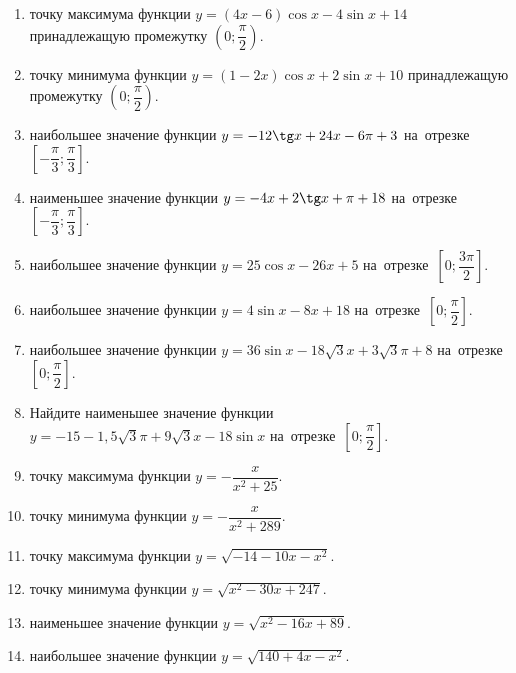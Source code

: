 \documentclass[a4paper,10pt]{article}
\begin{document}
\begin{enumerate}
\item {} точку максимума функции $y=\left(4x-6\right)\cos x -4\sin x+14$
принадлежащую промежутку $\left(0;\dfrac{\pi}{2}\right)$.

\item {} точку минимума функции $y=\left(1-2x\right)\cos x +2\sin x+10$
принадлежащую промежутку $\left(0;\dfrac{\pi}{2}\right)$.

\item {} наибольшее значение функции $y=-12\tg x +24x-6\pi +3$ на~отрезке~$\left[-\dfrac{\pi}{3};\dfrac{\pi}{3}\right]$.

\item {} наименьшее значение функции $y=-4x +2\tg x+\pi+18$ на~отрезке~$\left[-\dfrac{\pi}{3};\dfrac{\pi}{3}\right]$.

\item {} наибольшее значение функции $y=25\cos x-26x+5$ на~отрезке~$\left[0;\dfrac{3\pi}{2}\right]$.

\item {} наибольшее значение функции $y=4\sin x-8x+18$ на~отрезке~$\left[0;\dfrac{\pi}{2}\right]$.

\item {} наибольшее значение функции $y=36\sin x-18\sqrt{3}x+3\sqrt{3}\pi +8$ на~отрезке~$\left[0;\dfrac{\pi}{2}\right]$.

\item Найдите наименьшее значение функции $y=-15-1,5\sqrt{3}\pi+9\sqrt{3}x-18\sin x$ на~отрезке~$\left[0;\dfrac{\pi}{2}\right]$.

\item {} точку максимума функции $y=-\dfrac{x}{ x^2 +25}$.

\item {} точку минимума функции $y=-\dfrac{x}{ x^2 +289}$.

\item {} точку максимума функции $y=\sqrt{-14-10x-x^2}$.

\item {} точку минимума функции $y=\sqrt{x^2-30x+247}$.

\item {} наименьшее значение функции $y=\sqrt{x^2-16x+89}$.

\item {} наибольшее значение функции $y=\sqrt{140+4x-x^2}$.


\end{enumerate}
\end{document}
